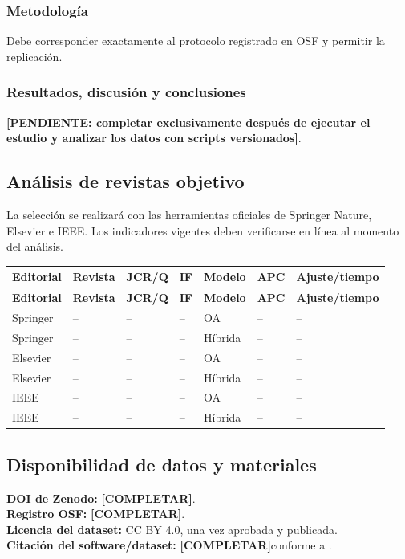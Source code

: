 \documentclass[12pt,journal,onecolumn]{IEEEtran}
\newcommand{\pendiente}[1]{\textcolor{red!70!black}{\textbf{[PENDIENTE: #1]}}}
\newcommand{\completar}{\textcolor{red!70!black}{\textbf{[COMPLETAR]}}}
\begin{document}
\subsubsection{Metodología}
Debe corresponder exactamente al protocolo registrado en OSF y permitir la replicación.

\subsubsection{Resultados, discusión y conclusiones}
\pendiente{completar exclusivamente después de ejecutar el estudio y analizar los datos con scripts versionados}.

\subsection{Análisis de revistas objetivo}
La selección se realizará con las herramientas oficiales de Springer Nature, Elsevier e IEEE. Los indicadores vigentes deben verificarse en línea al momento del análisis.

\small
\begin{longtable}{P{0.09\textwidth}P{0.18\textwidth}P{0.11\textwidth}P{0.07\textwidth}P{0.09\textwidth}P{0.09\textwidth}P{0.17\textwidth}}\toprule
\textbf{Editorial} & \textbf{Revista} & \textbf{JCR/Q} & \textbf{IF} & \textbf{Modelo} & \textbf{APC} & \textbf{Ajuste/tiempo}\\\midrule\endfirsthead
\toprule\textbf{Editorial} & \textbf{Revista} & \textbf{JCR/Q} & \textbf{IF} & \textbf{Modelo} & \textbf{APC} & \textbf{Ajuste/tiempo}\\\midrule\endhead
Springer & -- & -- & -- & OA & -- & --\\
Springer & -- & -- & -- & Híbrida & -- & --\\
Elsevier & -- & -- & -- & OA & -- & --\\
Elsevier & -- & -- & -- & Híbrida & -- & --\\
IEEE & -- & -- & -- & OA & -- & --\\
IEEE & -- & -- & -- & Híbrida & -- & --\\\bottomrule
\end{longtable}
\normalsize

\subsection{Disponibilidad de datos y materiales}
\textbf{DOI de Zenodo:} \completar.\\
\textbf{Registro OSF:} \completar.\\
\textbf{Licencia del dataset:} CC BY 4.0, una vez aprobada y publicada.\\
\textbf{Citación del software/dataset:} \completar conforme a \cite{smith2016software,druskat2021cff}.
\end{document}

